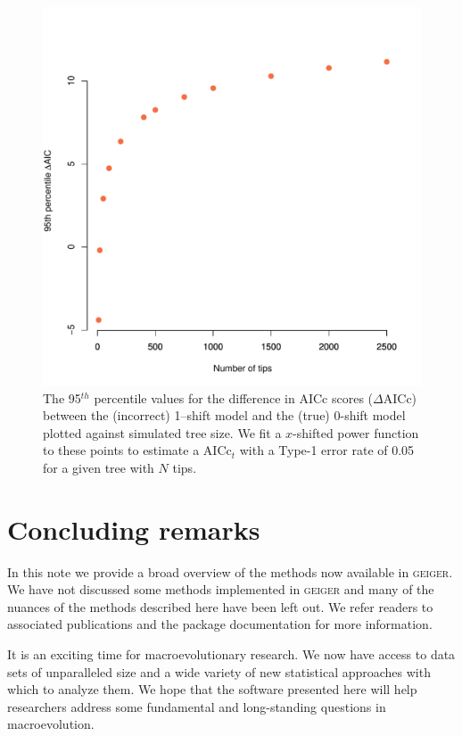 \begin{figure}[p]
 \centering
  \includegraphics[width=\textwidth]{figs/BD_percentiles}
  \caption[Setting the \textsc{medusa} threshold via simulation]{The 95$^{th}$ percentile values for the difference in AICc scores ($\Delta$AICc) between the (incorrect) 1--shift model and the (true) 0-shift model plotted against simulated tree size. We fit a $x$-shifted power function to these points to estimate a AICc$_{t}$ with a Type-1 error rate of 0.05 for a given tree with $N$ tips.}
  \label{fig:medusa-threshold}
\end{figure}


\section{Concluding remarks}

In this note we provide a broad overview of the methods now available in \textsc{geiger}. We have not discussed some methods implemented in \textsc{geiger} \citep[e.g., `Congruification' for time-scaling large trees;][]{Eastman2013} and many of the nuances of the methods described here have been left out. We refer readers to associated publications and the package documentation for more information.

It is an exciting time for macroevolutionary research. We now have access to data sets of unparalleled size and a wide variety of new statistical approaches with which to analyze them. We hope that the software presented here will help researchers address some fundamental and long-standing questions in macroevolution. 
